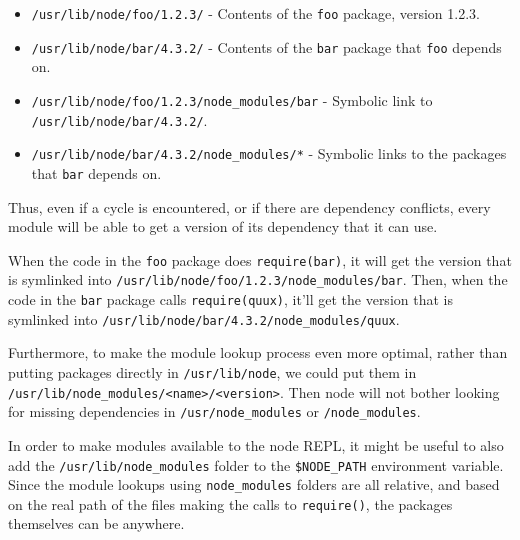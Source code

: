 \begin{itemize}
\itemsep1pt\parskip0pt
\item
  \texttt{/usr/lib/node/foo/1.2.3/} - Contents of the \texttt{foo}
  package, version 1.2.3.
\item
  \texttt{/usr/lib/node/bar/4.3.2/} - Contents of the \texttt{bar}
  package that \texttt{foo} depends on.
\item
  \texttt{/usr/lib/node/foo/1.2.3/node\_modules/bar} - Symbolic link to
  \texttt{/usr/lib/node/bar/4.3.2/}.
\item
  \texttt{/usr/lib/node/bar/4.3.2/node\_modules/*} - Symbolic links to
  the packages that \texttt{bar} depends on.
\end{itemize}

Thus, even if a cycle is encountered, or if there are dependency
conflicts, every module will be able to get a version of its dependency
that it can use.

When the code in the \texttt{foo} package does
\texttt{require(\textquotesingle{}bar\textquotesingle{})}, it will get
the version that is symlinked into
\texttt{/usr/lib/node/foo/1.2.3/node\_modules/bar}. Then, when the code
in the \texttt{bar} package calls
\texttt{require(\textquotesingle{}quux\textquotesingle{})}, it'll get
the version that is symlinked into
\texttt{/usr/lib/node/bar/4.3.2/node\_modules/quux}.

Furthermore, to make the module lookup process even more optimal, rather
than putting packages directly in \texttt{/usr/lib/node}, we could put
them in
\texttt{/usr/lib/node\_modules/\textless{}name\textgreater{}/\textless{}version\textgreater{}}.
Then node will not bother looking for missing dependencies in
\texttt{/usr/node\_modules} or \texttt{/node\_modules}.

In order to make modules available to the node REPL, it might be useful
to also add the \texttt{/usr/lib/node\_modules} folder to the
\texttt{\$NODE\_PATH} environment variable. Since the module lookups
using \texttt{node\_modules} folders are all relative, and based on the
real path of the files making the calls to \texttt{require()}, the
packages themselves can be anywhere.
